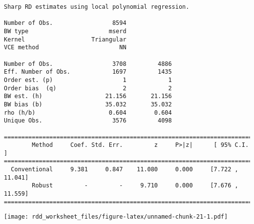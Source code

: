 \documentclass[
  12pt,
  leqno]{article}
\newenvironment{Shaded}{\begin{snugshade}}{\end{snugshade}}
\newcommand{\AttributeTok}[1]{\textcolor[rgb]{0.13,0.29,0.53}{#1}}
\newcommand{\FunctionTok}[1]{\textcolor[rgb]{0.13,0.29,0.53}{\textbf{#1}}}
\newcommand{\NormalTok}[1]{#1}
\newcommand{\SpecialCharTok}[1]{\textcolor[rgb]{0.81,0.36,0.00}{\textbf{#1}}}
\begin{document}
\begin{verbatim}
Sharp RD estimates using local polynomial regression.

Number of Obs.                 8594
BW type                       mserd
Kernel                   Triangular
VCE method                       NN

Number of Obs.                 3708         4886
Eff. Number of Obs.            1697         1435
Order est. (p)                    1            1
Order bias  (q)                   2            2
BW est. (h)                  21.156       21.156
BW bias (b)                  35.032       35.032
rho (h/b)                     0.604        0.604
Unique Obs.                    3576         4098

=============================================================================
        Method     Coef. Std. Err.         z     P>|z|      [ 95% C.I. ]       
=============================================================================
  Conventional     9.381     0.847    11.080     0.000     [7.722 , 11.041]    
        Robust         -         -     9.710     0.000     [7.676 , 11.559]    
=============================================================================
\end{verbatim}

\begin{Shaded}
\end{Shaded}

\texttt{[image: rdd\_worksheet\_files/figure-latex/unnamed-chunk-21-1.pdf]}
\normalsize

\newpage

\renewcommand\refname{References}
  
\end{document}
